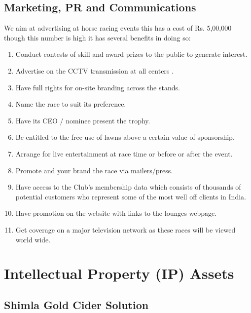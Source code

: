 \documentclass[11pt]{article}
\begin{document}
  \subsection{Marketing, PR and Communications}
We aim at advertising at horse racing events this has a cost of Rs. 5,00,000 though this number is high it has several benefits in doing so:
\begin{enumerate}
\item Conduct contests of skill and award prizes to the public to generate interest.
\item Advertise on the CCTV transmission at all centers .
\item Have full rights for on-site branding across the stands.
\item Name the race to suit its preference.
\item Have its CEO / nominee present the trophy.
\item Be entitled to the free use of lawns above a certain value of sponsorship.
\item Arrange for live entertainment at race time or before or after the event.
\item Promote and your brand the race via mailers/press.
\item Have access to the Club's membership data which consists of thousands of potential customers who represent some of the most well off clients in India.
\item Have promotion on the website with links to the lounges webpage.
\item Get coverage on a major television network as these races will be viewed world wide.
\end{enumerate}

\newpage
\section{Intellectual Property (IP) Assets}
  \subsection{Shimla Gold Cider Solution}
\end{document}
